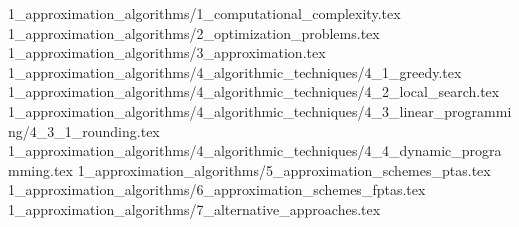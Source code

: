 \documentclass{article}
\begin{document}
	\tableofcontents
	\newpage
	{1_approximation_algorithms/1_computational_complexity.tex}
	{1_approximation_algorithms/2_optimization_problems.tex}
	{1_approximation_algorithms/3_approximation.tex}
	{1_approximation_algorithms/4_algorithmic_techniques/4_1_greedy.tex}
	{1_approximation_algorithms/4_algorithmic_techniques/4_2_local_search.tex}
	{1_approximation_algorithms/4_algorithmic_techniques/4_3_linear_programming/4_3_1_rounding.tex}
	{1_approximation_algorithms/4_algorithmic_techniques/4_4_dynamic_programming.tex}
	{1_approximation_algorithms/5_approximation_schemes_ptas.tex}
	{1_approximation_algorithms/6_approximation_schemes_fptas.tex}
	{1_approximation_algorithms/7_alternative_approaches.tex}
\end{document}
